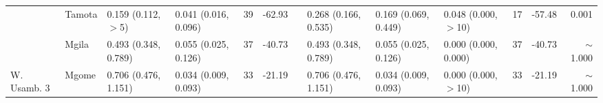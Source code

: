 \begin{tabular}{llllclllllclr}
            & Tamota         & 0.159 (0.112, $>$5)    & 0.041 (0.016, 0.096)   & 39   & -62.93   & & 0.268  (0.166, 0.535)   & 0.169  (0.069, 0.449)   & 0.048 (0.000, $>$10)   & 17  & -57.48   & 0.001\\
            & Mgila          & 0.493 (0.348, 0.789)   & 0.055 (0.025, 0.126)   & 37   & -40.73   & & 0.493  (0.348, 0.789)   & 0.055  (0.025, 0.126)   & 0.000 (0.000, 0.000)   & 37  & -40.73   & $\sim$1.000\\
\cmidrule{2-13}
W. Usamb. 3 & Mgome          & 0.706 (0.476, 1.151)   & 0.034 (0.009, 0.093)   & 33   & -21.19   & & 0.706  (0.476, 1.151)   & 0.034  (0.009, 0.093)   & 0.000 (0.000, $>$10)   & 33  & -21.19   & $\sim$1.000\\
\bottomrule
\end{tabular}